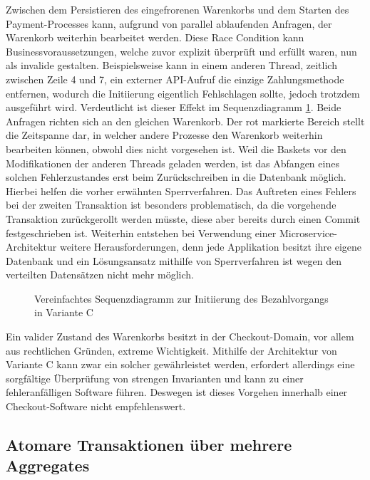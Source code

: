 Zwischen dem Persistieren des eingefrorenen Warenkorbs und dem Starten des Payment-Processes kann, aufgrund von parallel ablaufenden Anfragen, der Warenkorb weiterhin bearbeitet werden. Diese \Gls{Race Condition} kann Businessvoraussetzungen, welche zuvor explizit überprüft und erfüllt waren, nun als invalide gestalten. Beispielsweise kann in einem anderen Thread, zeitlich zwischen Zeile 4 und 7, ein externer API-Aufruf die einzige Zahlungsmethode entfernen, wodurch die Initiierung eigentlich Fehlschlagen sollte, jedoch trotzdem ausgeführt wird. Verdeutlicht ist dieser Effekt im Sequenzdiagramm \ref{fig:VarC-Sequence-Alt}. Beide Anfragen richten sich an den gleichen Warenkorb. Der rot markierte Bereich stellt die Zeitspanne dar, in welcher andere Prozesse den Warenkorb weiterhin bearbeiten können, obwohl dies nicht vorgesehen ist. Weil die Baskets vor den Modifikationen der anderen Threads geladen werden, ist das Abfangen eines solchen Fehlerzustandes erst beim Zurückschreiben in die Datenbank möglich. Hierbei helfen die vorher erwähnten Sperrverfahren. Das Auftreten eines Fehlers bei der zweiten Transaktion ist besonders problematisch, da die vorgehende Transaktion zurückgerollt werden müsste, diese aber bereits durch einen Commit festgeschrieben ist. Weiterhin entstehen bei Verwendung einer Microservice-Architektur weitere Herausforderungen, denn jede Applikation besitzt ihre eigene Datenbank und ein Lösungsansatz mithilfe von Sperrverfahren ist wegen den verteilten Datensätzen nicht mehr möglich.

\begin{figure}[htbp]
	\centering
	
	\caption{Vereinfachtes Sequenzdiagramm zur Initiierung des Bezahlvorgangs in Variante C}
	\label{fig:VarC-Sequence-Alt}
\end{figure}

Ein valider Zustand des Warenkorbs besitzt in der Checkout-Domain, vor allem aus rechtlichen Gründen, extreme Wichtigkeit. Mithilfe der Architektur von Variante C kann zwar ein solcher gewährleistet werden, erfordert allerdings eine sorgfältige Überprüfung von strengen Invarianten und kann zu einer fehleranfälligen Software führen. Deswegen ist dieses Vorgehen innerhalb einer Checkout-Software nicht empfehlenswert.

\subsection{Atomare Transaktionen über mehrere Aggregates}

